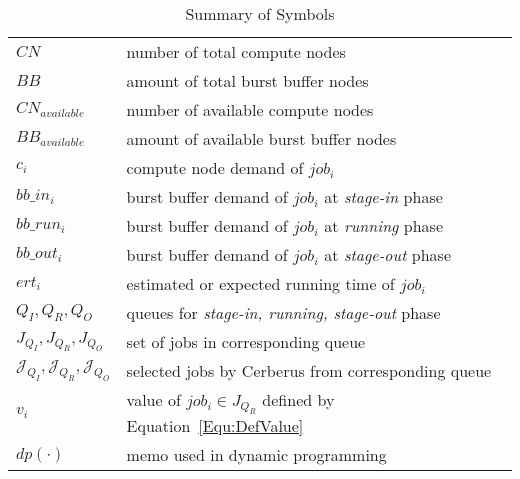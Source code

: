 \begin{table}[!htbp] 
        \renewcommand{\arraystretch}{1.3}
        \caption{Summary of Symbols}
        \label{Tab:Symbols}
        \centering
        \begin{tabular}{l|l}
                \hline
                $CN$ & number of total compute nodes \\
                $BB$ & amount of total burst buffer nodes \\
                $CN_{available}$ & number of available compute nodes \\
                $BB_{available}$ & amount of available burst buffer nodes \\
                $c_i$ & compute node demand of $job_i$ \\
                $bb\_in_i$ & burst buffer demand of $job_i$ at \textit{stage-in} phase \\
                $bb\_run_i$ & burst buffer demand of $job_i$ at \textit{running} phase \\
                $bb\_out_i$ & burst buffer demand of $job_i$ at \textit{stage-out} phase \\
                $ert_i$ & estimated or expected running time of $job_i$ \\
                $Q_I, Q_R, Q_O$ & queues for \textit{stage-in, running, stage-out} phase \\
                $J_{Q_I}, J_{Q_R}, J_{Q_O}$ & set of jobs in corresponding queue \\
                $\mathcal{J}_{Q_I}, \mathcal{J}_{Q_R}, \mathcal{J}_{Q_O}$ & selected jobs by Cerberus from corresponding queue\\
                $v_i$ & value of $job_i \in J_{Q_R}$ defined by Equation~\ref{Equ:DefValue}\\
                $dp(\cdot)$ & memo used in dynamic programming \\
                \hline
        \end{tabular}
\end{table}

